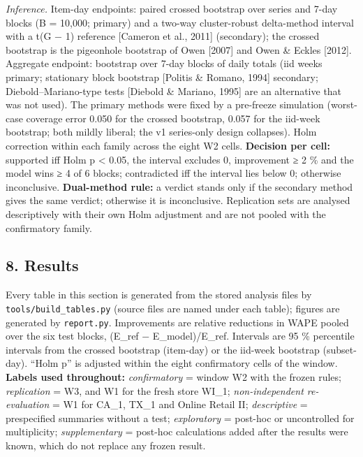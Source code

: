 \documentclass[
]{article}
\begin{document}
\emph{Inference.} Item-day endpoints: paired crossed bootstrap over
series and 7-day blocks (B = 10,000; primary) and a two-way
cluster-robust delta-method interval with a t(G − 1) reference
{[}Cameron et al., 2011{]} (secondary); the crossed bootstrap is the
pigeonhole bootstrap of Owen {[}2007{]} and Owen \& Eckles {[}2012{]}.
Aggregate endpoint: bootstrap over 7-day blocks of daily totals (iid
weeks primary; stationary block bootstrap {[}Politis \& Romano, 1994{]}
secondary; Diebold--Mariano-type tests {[}Diebold \& Mariano, 1995{]}
are an alternative that was not used). The primary methods were fixed by
a pre-freeze simulation (worst-case coverage error 0.050 for the crossed
bootstrap, 0.057 for the iid-week bootstrap; both mildly liberal; the v1
series-only design collapses). Holm correction within each family across
the eight W2 cells. \textbf{Decision per cell:} supported iff Holm p
\textless{} 0.05, the interval excludes 0, improvement ≥ 2 \% and the
model wins ≥ 4 of 6 blocks; contradicted iff the interval lies below 0;
otherwise inconclusive. \textbf{Dual-method rule:} a verdict stands only
if the secondary method gives the same verdict; otherwise it is
inconclusive. Replication sets are analysed descriptively with their own
Holm adjustment and are not pooled with the confirmatory family.

\subsection{8. Results}\label{results}

Every table in this section is generated from the stored analysis files
by \texttt{tools/build\_tables.py} (source files are named under each
table); figures are generated by \texttt{report.py}. Improvements are
relative reductions in WAPE pooled over the six test blocks, (E\_ref −
E\_model)/E\_ref. Intervals are 95 \% percentile intervals from the
crossed bootstrap (item-day) or the iid-week bootstrap (subset-day).
``Holm p'' is adjusted within the eight confirmatory cells of the
window. \textbf{Labels used throughout:} \emph{confirmatory} = window W2
with the frozen rules; \emph{replication} = W3, and W1 for the fresh
store WI\_1; \emph{non-independent re-evaluation} = W1 for CA\_1, TX\_1
and Online Retail II; \emph{descriptive} = prespecified summaries
without a test; \emph{exploratory} = post-hoc or uncontrolled for
multiplicity; \emph{supplementary} = post-hoc calculations added after
the results were known, which do not replace any frozen result.
\end{document}
